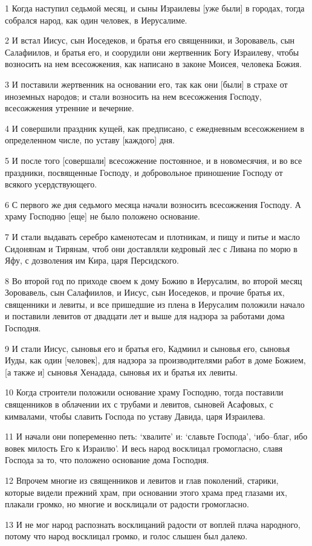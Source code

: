 \par 1 Когда наступил седьмой месяц, и сыны Израилевы [уже были] в городах, тогда собрался народ, как один человек, в Иерусалиме.
\par 2 И встал Иисус, сын Иоседеков, и братья его священники, и Зоровавель, сын Салафиилов, и братья его, и соорудили они жертвенник Богу Израилеву, чтобы возносить на нем всесожжения, как написано в законе Моисея, человека Божия.
\par 3 И поставили жертвенник на основании его, так как они [были] в страхе от иноземных народов; и стали возносить на нем всесожжения Господу, всесожжения утренние и вечерние.
\par 4 И совершили праздник кущей, как предписано, с ежедневным всесожжением в определенном числе, по уставу [каждого] дня.
\par 5 И после того [совершали] всесожжение постоянное, и в новомесячия, и во все праздники, посвященные Господу, и добровольное приношение Господу от всякого усердствующего.
\par 6 С первого же дня седьмого месяца начали возносить всесожжения Господу. А храму Господню [еще] не было положено основание.
\par 7 И стали выдавать серебро каменотесам и плотникам, и пищу и питье и масло Сидонянам и Тирянам, чтоб они доставляли кедровый лес с Ливана по морю в Яфу, с дозволения им Кира, царя Персидского.
\par 8 Во второй год по приходе своем к дому Божию в Иерусалим, во второй месяц Зоровавель, сын Салафиилов, и Иисус, сын Иоседеков, и прочие братья их, священники и левиты, и все пришедшие из плена в Иерусалим положили начало и поставили левитов от двадцати лет и выше для надзора за работами дома Господня.
\par 9 И стали Иисус, сыновья его и братья его, Кадмиил и сыновья его, сыновья Иуды, как один [человек], для надзора за производителями работ в доме Божием, [а также и] сыновья Хенадада, сыновья их и братья их левиты.
\par 10 Когда строители положили основание храму Господню, тогда поставили священников в облачении их с трубами и левитов, сыновей Асафовых, с кимвалами, чтобы славить Господа по уставу Давида, царя Израилева.
\par 11 И начали они попеременно петь: `хвалите' и: `славьте Господа', `ибо--благ, ибо вовек милость Его к Израилю'. И весь народ восклицал громогласно, славя Господа за то, что положено основание дома Господня.
\par 12 Впрочем многие из священников и левитов и глав поколений, старики, которые видели прежний храм, при основании этого храма пред глазами их, плакали громко, но многие и восклицали от радости громогласно.
\par 13 И не мог народ распознать восклицаний радости от воплей плача народного, потому что народ восклицал громко, и голос слышен был далеко.

